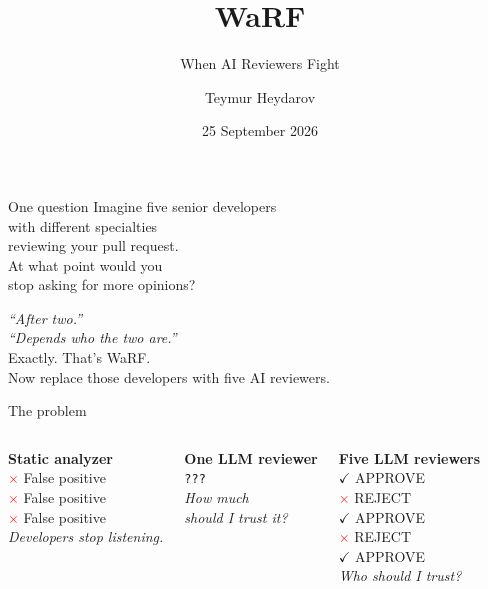 \documentclass[10pt]{beamer}
\title{WaRF}
\subtitle{When AI Reviewers Fight}
\author{Teymur Heydarov}
\institute{SoCraTes Austria 2026}
\date{25 September 2026}
\begin{document}
\maketitle

\begin{frame}{One question}
  \Large
  Imagine five senior developers\\
  with different specialties\\
  reviewing your pull request.\\[0.8em]
  \pause
  At what point would you\\
  \alert{stop asking for more opinions?}

  \vfill
  \pause
  \normalsize
  \textit{``After two.''}\\[0.3em]
  \textit{``Depends who the two are.''}\\[0.6em]
  \alert{Exactly. That's WaRF.}\\[0.3em]
  \small Now replace those developers with five AI reviewers.
\end{frame}

\begin{frame}{The problem}
  \begin{columns}[T]
    \textbf{Static analyzer}\\[0.5em]
    \small
    \textcolor{red}{$\times$} False positive\\
    \textcolor{red}{$\times$} False positive\\
    \textcolor{red}{$\times$} False positive\\[0.5em]
    \textit{Developers stop listening.}

    \textbf{One LLM reviewer}\\[0.5em]
    \small
    \texttt{???}\\[0.5em]
    \textit{How much\\should I trust it?}

    \textbf{Five LLM reviewers}\\[0.5em]
    \small
    \textcolor{green!60!black}{$\checkmark$} APPROVE\\
    \textcolor{red}{$\times$} REJECT\\
    \textcolor{green!60!black}{$\checkmark$} APPROVE\\
    \textcolor{red}{$\times$} REJECT\\
    \textcolor{green!60!black}{$\checkmark$} APPROVE\\[0.5em]
    \textit{Who should I trust?}
  \end{columns}
\end{frame}
\end{document}
